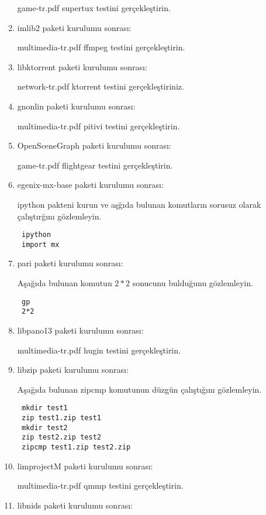 \documentclass[a4paper,10pt]{article}
\begin{document}
\begin{enumerate}
game-tr.pdf supertux testini gerçekleştirin.

\item imlib2 paketi kurulumu sonrası:

multimedia-tr.pdf ffmpeg testini gerçekleştirin.

\item libktorrent paketi kurulumu sonrası:

network-tr.pdf ktorrent testini gerçekleştiriniz.

\item gnonlin paketi kurulumu sonrası:

multimedia-tr.pdf pitivi testini gerçekleştirin.

\item OpenSceneGraph paketi kurulumu sonrası:

game-tr.pdf flightgear testini gerçekleştirin.

\item egenix-mx-base paketi kurulumu sonrası:

ipython pakteni kurun ve aşğıda bulunan komutların sorusuz olarak çalıştırğını gözlemleyin.

\begin{verbatim}
 ipython
 import mx
\end{verbatim}


\item pari paketi kurulumu sonrası:

Aşağıda bulunan komutun $2*2$ sonucunu bulduğunu gözlemleyin.
\begin{verbatim}
 gp 
 2*2
\end{verbatim}

\item libpano13 paketi kurulumu sonrası:
  
multimedia-tr.pdf hugin testini gerçekleştirin.

\item libzip paketi kurulumu sonrası:

Aşağıda bulunan zipcmp komutunun düzgün çalıştığını gözlemleyin.
\begin{verbatim}
 mkdir test1
 zip test1.zip test1
 mkdir test2
 zip test2.zip test2
 zipcmp test1.zip test2.zip
\end{verbatim}

\item limprojectM paketi kurulumu sonrası:
  
multimedia-tr.pdf qmmp testini gerçekleştirin.

\item libnids paketi kurulumu sonrası:


\end{enumerate}
\end{document}
